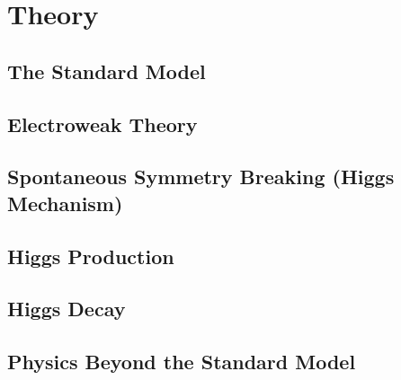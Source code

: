 \chapter{Theory}

\section{The Standard Model}

\section{Electroweak Theory}


\section{Spontaneous Symmetry Breaking (Higgs Mechanism)}

\section{Higgs Production}

\section{Higgs Decay}

\section{Physics Beyond the Standard Model}

